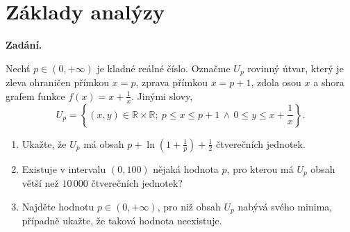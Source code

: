 \section{Základy analýzy}

\noindent\textbf{Zadání.}\par
Nechť $p \in (0, +\infty)$ je kladné reálné číslo. Označme $U_p$ rovinný útvar, který je zleva ohraničen přímkou $x = p$, zprava přímkou $x = p + 1$, zdola osou $x$ a shora grafem funkce $f(x) = x + \frac{1}{x}$. Jinými slovy,
\[
  U_p = \left\{ (x, y) \in \mathbb{R} \times \mathbb{R};\ p \leq x \leq p + 1 \,\wedge\, 0 \leq y \leq x + \frac{1}{x} \right\}.
\]
\begin{enumerate}
  \item Ukažte, že $U_p$ má obsah $p + \ln\!\left(1 + \frac{1}{p}\right) + \frac{1}{2}$ čtverečních jednotek.
  \item Existuje v intervalu $(0, 100)$ nějaká hodnota $p$, pro kterou má $U_p$ obsah větší než $10\,000$ čtverečních jednotek?
  \item Najděte hodnotu $p \in (0, +\infty)$, pro niž obsah $U_p$ nabývá svého minima, případně ukažte, že taková hodnota neexistuje.
\end{enumerate}

